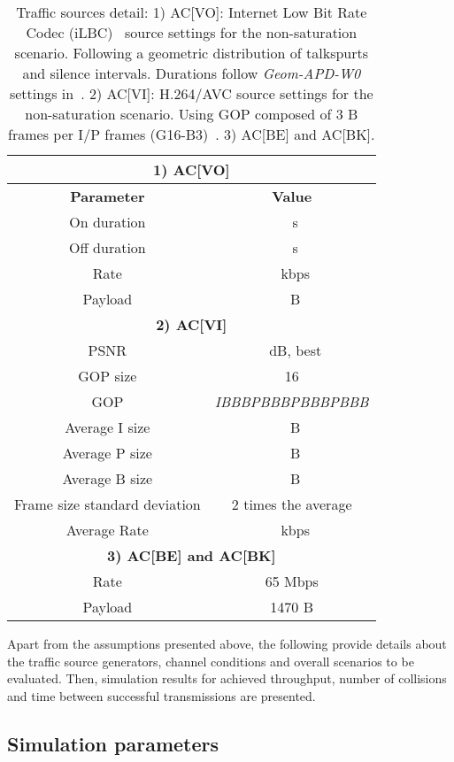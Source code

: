 \documentclass[a4paper]{article}
\begin{document}
	\begin{table}[t]
		\centering
		\caption{Traffic sources detail: 1) AC[VO]: Internet Low Bit Rate Codec (iLBC)~\cite{andersen2004internet} source settings for the non-saturation scenario. Following a geometric distribution of talkspurts and silence intervals. Durations follow \emph{Geom-APD-W0} settings in~\cite{menth2009source}. 2) AC[VI]: H.264/AVC source settings for the non-saturation scenario. Using GOP composed of 3 B frames per I/P frames (G16-B3)~\cite{menth2009source}. 3) AC[BE] and AC[BK].}
		\label{tab:voice}
		\begin{tabular}{|c|c|}
			\hline
			\multicolumn{2}{|c|}{{\bfseries 1) AC[VO]}}\\
			\hline
			{\bfseries Parameter} & {\bfseries Value}\\
			\hline
On duration & ~s\\
			Off duration & ~s\\
			Rate & ~kbps\\
			Payload & ~B\\
			\hline
			\multicolumn{2}{|c|}{{\bfseries 2) AC[VI]}}\\
			\hline
			PSNR & ~dB, best\\
			GOP size & 16\\
			GOP & \emph{IBBBPBBBPBBBPBBB}\\
			Average I size & ~B\\
			Average P size & ~B\\
			Average B size & ~B\\
			Frame size standard deviation & 2 times the average\\
			Average Rate & ~kbps\\
			\hline
			\multicolumn{2}{|c|}{{\bfseries 3) AC[BE] and AC[BK]}}\\
			\hline
			Rate & 65 Mbps\\
			Payload & 1470 B\\
			\hline
		\end{tabular}
	\end{table}
	


Apart from the assumptions presented above, the following provide details about the traffic source generators, channel conditions and overall scenarios to be evaluated. Then, simulation results for achieved throughput, number of collisions and time between successful transmissions are presented.

\subsection{Simulation parameters}\label{subsect:simParams}
\end{document}
